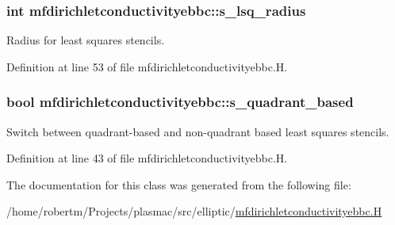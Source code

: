 \subsubsection[{\texorpdfstring{s\+\_\+lsq\+\_\+radius}{s_lsq_radius}}]{\setlength{\rightskip}{0pt plus 5cm}int mfdirichletconductivityebbc\+::s\+\_\+lsq\+\_\+radius\hspace{0.3cm}{\ttfamily [static]}}\hypertarget{classmfdirichletconductivityebbc_acb9e36ee825b3c22ccce9aac9538638b}{}\label{classmfdirichletconductivityebbc_acb9e36ee825b3c22ccce9aac9538638b}


Radius for least squares stencils. 



Definition at line 53 of file mfdirichletconductivityebbc.\+H.

\subsubsection[{\texorpdfstring{s\+\_\+quadrant\+\_\+based}{s_quadrant_based}}]{\setlength{\rightskip}{0pt plus 5cm}bool mfdirichletconductivityebbc\+::s\+\_\+quadrant\+\_\+based\hspace{0.3cm}{\ttfamily [static]}}\hypertarget{classmfdirichletconductivityebbc_a2634626499b25aa7af9b78a7a4f1ceba}{}\label{classmfdirichletconductivityebbc_a2634626499b25aa7af9b78a7a4f1ceba}


Switch between quadrant-\/based and non-\/quadrant based least squares stencils. 



Definition at line 43 of file mfdirichletconductivityebbc.\+H.



The documentation for this class was generated from the following file\+:\begin{DoxyCompactItemize}
\item 
/home/robertm/\+Projects/plasmac/src/elliptic/\hyperlink{mfdirichletconductivityebbc_8H}{mfdirichletconductivityebbc.\+H}\end{DoxyCompactItemize}

